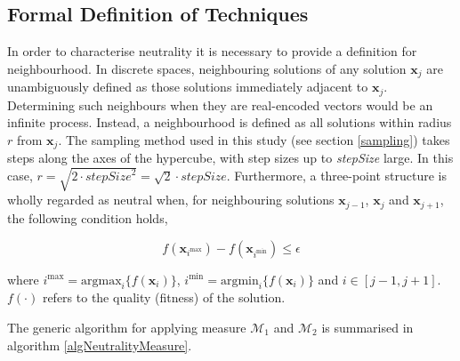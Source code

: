 \documentclass[conference]{IEEEtran}
\renewcommand{\vec}[1]{\mathbf{#1}}
\begin{document}
\subsection{Formal Definition of Techniques}
\label{neutralityMeasures}
In order to characterise neutrality it is necessary to provide a definition for neighbourhood. In discrete spaces, neighbouring solutions of any solution $\vec{x}_j$ are unambiguously defined as those solutions immediately adjacent to $\vec{x}_j$. Determining such neighbours when they are real-encoded vectors would be an infinite process. Instead, a neighbourhood is defined as all solutions within radius $r$ from $\vec{x}_j$. The sampling method used in this study (see section \ref{sampling}) takes steps along the axes of the hypercube, with step sizes up to \textit{stepSize} large. In this case, $r = \sqrt{2 \cdot {\textit{stepSize}}^2}= \sqrt{2} \cdot \textit{stepSize}$. Furthermore, a three-point structure is wholly regarded as neutral when, for neighbouring solutions $\vec{x}_{j-1}$, $\vec{x}_j$ and $\vec{x}_{j+1}$, the following condition holds,

\begin{equation}
\label{eqNeutralityDef}
	f(\vec{x}_{i^{\text{max}}}) - f(\vec{x}_{i^{\text{min}}}) \le \epsilon			 
\end{equation}

where $i^{\text{max}} = \text{argmax}_i\{f(\vec{x}_i)\}$, $i^{\text{min}} = \text{argmin}_i\{f(\vec{x}_i)\}$ and $i \in [j-1,j+1]$. $f(\cdot)$ refers to the quality (fitness) of the solution. 

The generic algorithm for applying measure ${\mathcal{M}_1}$ and ${\mathcal{M}_2}$ is summarised in algorithm \ref{algNeutralityMeasure}.
\end{document}
